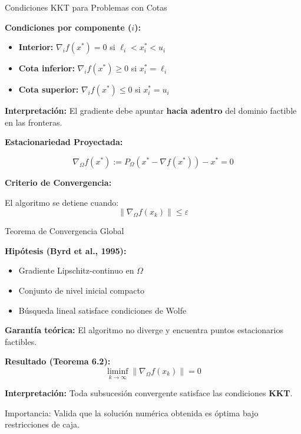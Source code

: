 \documentclass[
  ignorenonframetext,
]{beamer}
\begin{document}
\begin{frame}{Condiciones KKT para Problemas con Cotas}
\label{condiciones-kkt-para-problemas-con-cotas}
\justifying

\textbf{Condiciones por componente ($i$):}

\begin{itemize}
\item \textbf{Interior:} $\nabla_i f(x^*) = 0$ si $\ell_i < x^*_i < u_i$
\item \textbf{Cota inferior:} $\nabla_i f(x^*) \geq 0$ si $x^*_i = \ell_i$
\item \textbf{Cota superior:} $\nabla_i f(x^*) \leq 0$ si $x^*_i = u_i$
\end{itemize}

\vspace{0.1cm}

\textbf{Interpretación:} El gradiente debe apuntar
\textbf{hacia adentro} del dominio factible en las fronteras.

\textbf{Estacionariedad Proyectada:}

\[\nabla_\Omega f(x^*) := P_\Omega(x^* - \nabla f(x^*)) - x^* = 0\]

\vspace{0.1cm}

\textbf{Criterio de Convergencia:}

El algoritmo se detiene cuando:
\[\|\nabla_\Omega f(x_k)\| \leq \varepsilon\]
\end{frame}

\begin{frame}{Teorema de Convergencia Global}
\label{teorema-de-convergencia-global}
\justifying

\textbf{Hipótesis (Byrd et al., 1995):}

\begin{itemize}
\item[(H1)] Gradiente Lipschitz-continuo en $\Omega$
\item[(H2)] Conjunto de nivel inicial compacto
\item[ ] Búsqueda lineal satisface condiciones de Wolfe
\end{itemize}

\vspace{0.1cm}

\textbf{Garantía teórica:} El algoritmo no diverge y encuentra puntos
estacionarios factibles.

\textbf{Resultado (Teorema 6.2):}
\[\liminf_{k \to \infty} \|\nabla_\Omega f(x_k)\| = 0\]

\textbf{Interpretación:} Toda subsucesión convergente satisface las
condiciones \textbf{KKT}.

\alert{Importancia:} Valida que la solución numérica obtenida es óptima
bajo restricciones de caja.
\end{frame}
\end{document}

